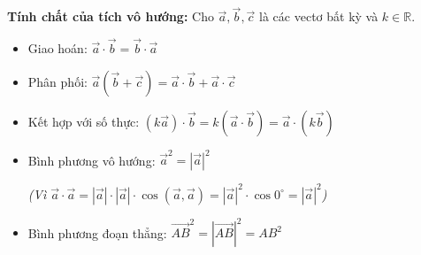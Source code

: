 \documentclass[12pt,a4paper]{extarticle}
\begin{document}
    \item \textbf{Tính chất của tích vô hướng:} Cho $\vec{a}, \vec{b}, \vec{c}$ là các vectơ bất kỳ và $k \in \mathbb{R}$.
    \begin{itemize}[label=$\bullet$, leftmargin=1.5cm, itemsep=0.4em]
        \item Giao hoán: $\vec{a} \cdot \vec{b} = \vec{b} \cdot \vec{a}$
        \item Phân phối: $\vec{a}(\vec{b} + \vec{c}) = \vec{a}\cdot\vec{b} + \vec{a}\cdot\vec{c}$
        \item Kết hợp với số thực: $(k\vec{a}) \cdot \vec{b} = k(\vec{a} \cdot \vec{b}) = \vec{a} \cdot (k\vec{b})$
        \item Bình phương vô hướng: $\vec{a}^2 = |\vec{a}|^2$
        \par\textit{(Vì $\vec{a} \cdot \vec{a} = |\vec{a}| \cdot |\vec{a}| \cdot \cos(\vec{a}, \vec{a}) = |\vec{a}|^2 \cdot \cos 0^\circ = |\vec{a}|^2$)}
        \item Bình phương đoạn thẳng: $\vec{AB}^2 = |\vec{AB}|^2 = AB^2$
    \end{itemize}
\end{document}
